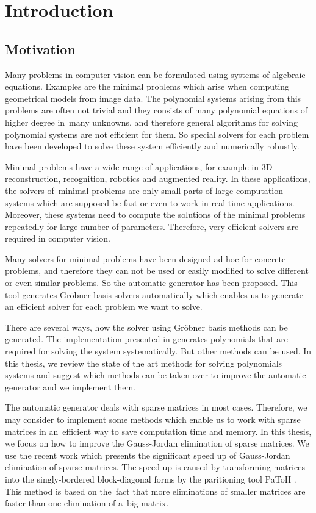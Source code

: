 \chapter{Introduction}
\section{Motivation}
Many problems in computer vision can be formulated using systems of algebraic equations. Examples are the minimal problems \cite{MinimalProblems} which arise when computing geometrical models from image data. The polynomial systems arising from this problems are often not trivial and they consists of many polynomial equations of higher degree in~many unknowns, and therefore general algorithms for solving polynomial systems are not efficient for them. So special solvers for each problem have been developed to solve these system efficiently and numerically robustly.

Minimal problems have a wide range of applications, for example in 3D reconstruction, recognition, robotics and augmented reality. In these applications, the solvers of~minimal problems are only small parts of large computation systems which are supposed be fast or even to work in real-time applications. Moreover, these systems need to compute the solutions of the minimal problems repeatedly for large number of parameters. Therefore, very efficient solvers are required in computer vision.

Many solvers for minimal problems have been designed ad hoc for concrete problems, and therefore they can not be used or easily modified to solve different or even similar problems. So the automatic generator \cite{AutoGen} has been proposed. This tool generates Gr\"obner basis solvers automatically which enables us to generate an efficient solver for each problem we want to solve.

There are several ways, how the solver using Gr\"obner basis methods can be generated. The implementation presented in \cite{AutoGen} generates polynomials that are required for solving the system systematically. But other methods can be used. In this thesis, we review the state of the art methods for solving polynomials systems and suggest which methods can be taken over to improve the automatic generator and we implement them.

The automatic generator deals with sparse matrices in most cases. Therefore, we may consider to implement some methods which enable us to work with sparse matrices in an~efficient way to save computation time and memory. In this thesis, we focus on how to improve the Gauss-Jordan elimination of sparse matrices. We use the recent work \cite{SBBD} which presents the significant speed up of Gauss-Jordan elimination of sparse matrices. The speed up is caused by transforming matrices into the singly-bordered block-diagonal forms by the paritioning tool PaToH \cite{PaToH}. This method is based on the~fact that more eliminations of smaller matrices are faster than one elimination of a~big matrix.

